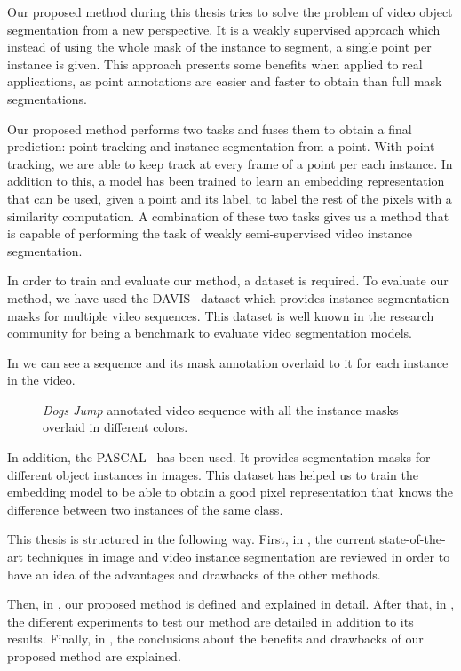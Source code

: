 Our proposed method during this thesis tries to solve the problem of video object segmentation from a new perspective.
It is a weakly supervised approach which instead of using the whole mask of the instance to segment, a single point per instance is given.
This approach presents some benefits when applied to real applications, as point annotations are easier and faster to obtain than full mask segmentations.


Our proposed method performs two tasks and fuses them to obtain a final prediction: point tracking and instance segmentation from a point.
With point tracking, we are able to keep track at every frame of a point per each instance.
In addition to this, a model has been trained to learn an embedding representation that can be used, given a point and its label, to label the rest of the pixels with a similarity computation.
A combination of these two tasks gives us a method that is capable of performing the task of weakly semi-supervised video instance segmentation.

In order to train and evaluate our method, a dataset is required.
To evaluate our method, we have used the DAVIS~\davisboth{} dataset which provides instance segmentation masks for multiple video sequences.
This dataset is well known in the research community for being a benchmark to evaluate video segmentation models.

In  we can see a sequence and its mask annotation overlaid to it for each instance in the video.

\begin{figure}[h]
  \centering
  \caption{\textit{Dogs Jump} annotated video sequence with all the instance masks overlaid in different colors. }
  \label{fig:intro:davis}
\end{figure}

In addition, the PASCAL~\pascal{} has been used.
It provides segmentation masks for different object instances in images.
This dataset has helped us to train the embedding model to be able to obtain a good pixel representation that knows the difference between two instances of the same class.

This thesis is structured in the following way. First, in , the current state-of-the-art techniques in image and video instance segmentation are reviewed in order to have an idea of the advantages and drawbacks of the other methods.

Then, in , our proposed method is defined and explained in detail.
After that, in , the different experiments to test our method are detailed in addition to its results.
Finally, in , the conclusions about the benefits and drawbacks of our proposed method are explained.
